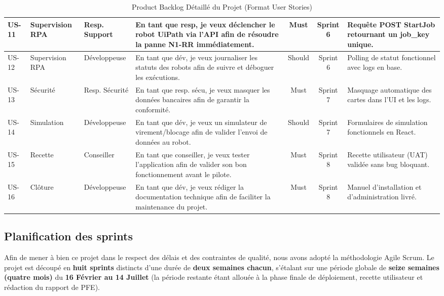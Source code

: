 \begin{table}[htbp]
\begin{tabular}{|l|p{2cm}|p{2cm}|p{4.5cm}|c|c|p{3.5cm}|}
US-11 & Supervision RPA & Resp. Support & En tant que resp, je veux déclencher le robot UiPath via l'API afin de résoudre la panne N1-RR immédiatement. & Must & Sprint 6 & Requête POST StartJob retournant un job\_key unique. \\ \hline
US-12 & Supervision RPA & Développeuse & En tant que dév, je veux journaliser les statuts des robots afin de suivre et déboguer les exécutions. & Should & Sprint 6 & Polling de statut fonctionnel avec logs en base. \\ \hline
US-13 & Sécurité & Resp. Sécurité & En tant que resp. sécu, je veux masquer les données bancaires afin de garantir la conformité. & Must & Sprint 7 & Masquage automatique des cartes dans l'UI et les logs. \\ \hline
US-14 & Simulation & Développeuse & En tant que dév, je veux un simulateur de virement/blocage afin de valider l'envoi de données au robot. & Should & Sprint 7 & Formulaires de simulation fonctionnels en React. \\ \hline
US-15 & Recette & Conseiller & En tant que conseiller, je veux tester l'application afin de valider son bon fonctionnement avant le pilote. & Must & Sprint 8 & Recette utilisateur (UAT) validée sans bug bloquant. \\ \hline
US-16 & Clôture & Développeuse & En tant que dév, je veux rédiger la documentation technique afin de faciliter la maintenance du projet. & Must & Sprint 8 & Manuel d'installation et d'administration livré. \\ \hline
\end{tabular}
\caption{Product Backlog Détaillé du Projet (Format User Stories)}
\label{tab:product_backlog}
\end{table}

\subsection{Planification des sprints}
\label{subsec:planification_sprints}

Afin de mener à bien ce projet dans le respect des délais et des contraintes de qualité, nous avons adopté la méthodologie Agile Scrum. Le projet est découpé en \textbf{huit sprints} distincts d’une durée de \textbf{deux semaines chacun}, s’étalant sur une période globale de \textbf{seize semaines (quatre mois)} du \textbf{16 Février au 14 Juillet} (la période restante étant allouée à la phase finale de déploiement, recette utilisateur et rédaction du rapport de PFE).

